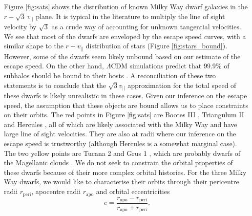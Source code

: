 \documentclass[useAMS,twocolumn,usenatbib]{mn2e}
\def\vlos{{v_{||}}}
\def\rp{{r_\mathrm{peri}}}
\def\ra{{r_\mathrm{apo}}}
\def\ecc{{e}}
\begin{document}
Figure \ref{fig:sats} shows the distribution of known Milky Way dwarf galaxies in the $r-\sqrt{3}\,\vlos$ plane. 
It is typical in the literature to multiply the line of sight velocity by $\sqrt{3}$ as a crude way of accounting for unknown tangential velocities. 
We see that most of the dwarfs are enveloped by the escape speed curves, with a similar shape to the $r-\vlos$ distribution of stars (Figure \ref{fig:stars_bound}).
However, some of the dwarfs seem likely unbound based on our estimate of the escape speed. 
On the other hand, $\Lambda$CDM simulations predict that 99.9\% of subhalos should be bound to their hosts \citep{Bo13}. 
A reconciliation of these two statements is to conclude that the $\sqrt{3}\vlos$ approximation for the total speed of these dwarfs is likely unrealistic in these cases. 
Given our inference on the escape speed, the assumption that these objects are bound allows us to place constraints on their orbits. 
The red points in Figure \ref{fig:sats} are Bootes III \citep{Gr09,Ca09}, Triangulum II \citep{La15} and Hercules \citep{Be07}, all of which are likely associated with the Milky Way and have large line of sight velocities. 
They are also at radii where our inference on the escape speed is trustworthy (although Hercules is a somewhat marginal case).  
The two yellow points are Tucana 2 and Grus 1 \citep{Ko15,Be15}, which are probably dwarfs of the Magellanic clouds \citep{Je16}. 
We do not seek to constrain the orbital properties of these dwarfs because of their more complex orbital histories. 
For the three Milky Way dwarfs, we would like to characterise their orbits through their pericentre radii $\rp$, apocentre radii $\ra$ and orbital eccentricities
%
\begin{equation}
\ecc = \dfrac{\ra - \rp}{\ra + \rp}.
\end{equation}
%
\end{document}
